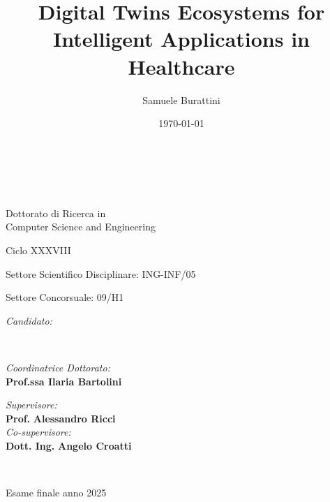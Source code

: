 \title{Digital Twins Ecosystems for Intelligent Applications in Healthcare}
\author{Samuele Burattini}
\date{\today}

\begin{titlepage}
	\begin{center}

		\large
		\textbf{\unibo \\ \disi}
		\\
		\noindent\hrulefill
		\vspace{0.4cm}

		\Large
		Dottorato di Ricerca in \\
		Computer Science and Engineering

		\vspace{0.4cm}

		Ciclo XXXVIII

		\vspace{0.4cm}

		Settore Scientifico Disciplinare: ING-INF/05

		Settore Concorsuale: 09/H1

		\Huge
		\vspace{3cm}
		\textbf{
			\thetitle
		}

		{\Large{
		\vspace{3cm}

		\textit{Candidato:\\}
		\centering
		\theauthor}
		\\}
		\large
		\vspace{2.5cm}
		\begin{minipage}[t]{0.49\textwidth}
			\begin{flushleft}
				\textit{Coordinatrice Dottorato:}
				\\
				\textbf{Prof.ssa Ilaria Bartolini}
			\end{flushleft}
		\end{minipage}
		\begin{minipage}[t]{0.5\textwidth}
			\begin{flushright}
				\textit{Supervisore:}
				\\
				\textbf{Prof.} \textbf{Alessandro Ricci}
				\\
				\vspace{0.4cm}
				\textit{Co-supervisore:}
				\\
				\textbf{Dott. Ing.} \textbf{Angelo Croatti}
			\end{flushright}

		\end{minipage}\\

		\vfill
		\noindent\hrulefill
		\vspace{0.3cm}
		\Large

		Esame finale anno 2025
	\end{center}
\end{titlepage}
\restoregeometry